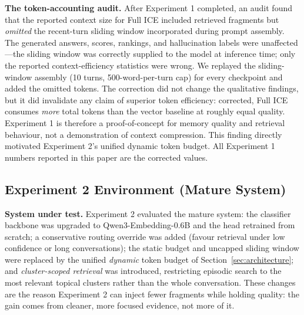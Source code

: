 \documentclass[10pt]{article}
\begin{document}
\textbf{The token-accounting audit.} After Experiment 1 completed, an audit found that the reported context size for Full ICE included retrieved fragments but \emph{omitted} the recent-turn sliding window incorporated during prompt assembly. The generated answers, scores, rankings, and hallucination labels were unaffected---the sliding window was correctly supplied to the model at inference time; only the reported context-efficiency statistics were wrong. We replayed the sliding-window assembly (10 turns, 500-word-per-turn cap) for every checkpoint and added the omitted tokens. The correction did not change the qualitative findings, but it did invalidate any claim of superior token efficiency: corrected, Full ICE consumes \emph{more} total tokens than the vector baseline at roughly equal quality. Experiment 1 is therefore a proof-of-concept for memory quality and retrieval behaviour, not a demonstration of context compression. This finding directly motivated Experiment 2's unified dynamic token budget. All Experiment 1 numbers reported in this paper are the corrected values.

\subsection{Experiment 2 Environment (Mature System)}
\label{sec:exp2-env}

\textbf{System under test.} Experiment 2 evaluated the mature system: the classifier backbone was upgraded to Qwen3-Embedding-0.6B and the head retrained from scratch; a conservative routing override was added (favour retrieval under low confidence or long conversations); the static budget and uncapped sliding window were replaced by the unified \emph{dynamic} token budget of Section~\ref{sec:architecture}; and \emph{cluster-scoped retrieval} was introduced, restricting episodic search to the most relevant topical clusters rather than the whole conversation. These changes are the reason Experiment 2 can inject fewer fragments while holding quality: the gain comes from cleaner, more focused evidence, not more of it.
\end{document}
